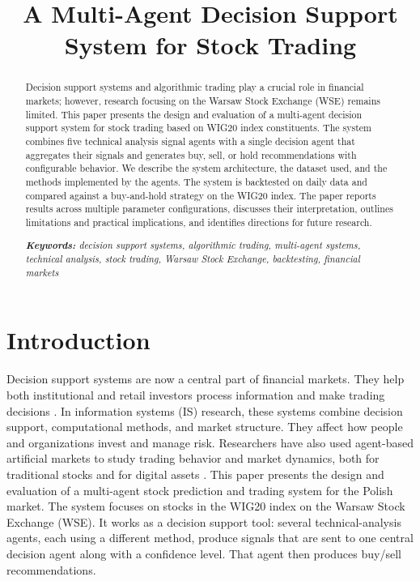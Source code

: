 \documentclass{icis}
\title{A Multi-Agent Decision Support System for Stock Trading}
\begin{document}
\maketitle

\begin{abstract}
Decision support systems and algorithmic trading play a crucial role in financial markets; however, research focusing on the Warsaw Stock Exchange (WSE) remains limited. This paper presents the design and evaluation of a multi-agent decision support system for stock trading based on WIG20 index constituents. The system combines five technical analysis signal agents with a single decision agent that aggregates their signals and generates buy, sell, or hold recommendations with configurable behavior.
We describe the system architecture, the dataset used, and the methods implemented by the agents. The system is backtested on daily data and compared against a buy-and-hold strategy on the WIG20 index. The paper reports results across multiple parameter configurations, discusses their interpretation, outlines limitations and practical implications, and identifies directions for future research.

\emph{\textbf{Keywords:} decision support systems, algorithmic trading, multi-agent systems, technical analysis, stock trading, Warsaw Stock Exchange, backtesting, financial markets}
\end{abstract}

\section{Introduction}

Decision support systems are now a central part of financial markets. They help both institutional and retail investors process information and make trading decisions \autocite{hendershott_does_2011}. In information systems (IS) research, these systems combine decision support, computational methods, and market structure. They affect how people and organizations invest and manage risk. Researchers have also used agent-based artificial markets to study trading behavior and market dynamics, both for traditional stocks and for digital assets \autocite{8675280}. This paper presents the design and evaluation of a multi-agent stock prediction and trading system for the Polish market. The system focuses on stocks in the WIG20 index on the Warsaw Stock Exchange (WSE). It works as a decision support tool: several technical-analysis agents, each using a different method, produce signals that are sent to one central decision agent along with a confidence level. That agent then produces buy/sell recommendations.
\end{document}
